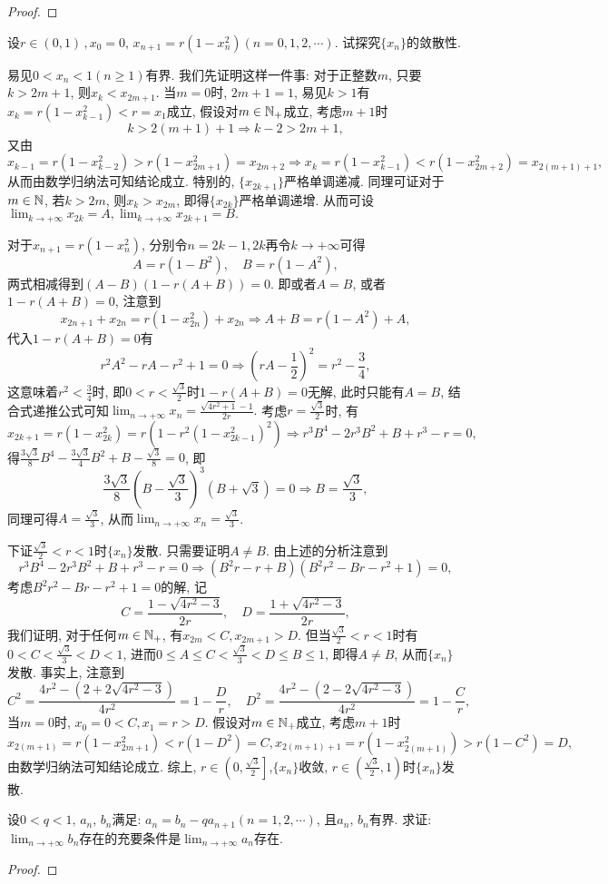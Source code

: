 \begin{quiza}
\begin{proof}
\end{proof}
\woe 设\(r\in (0,1)\,,x_0=0,\,x_{n+1}=r(1-x_n^2)(n=0,1,2,\cdots)\). 试探究\(\{x_n\}\)的敛散性.
\begin{solution}
易见\(0<x_n<1(n\geqslant 1)\)有界. 我们先证明这样一件事: 对于正整数\(m\), 只要\(k>2m+1\), 则\(x_k<x_{2m+1}\). 当\(m=0\)时, \(2m+1=1\), 易见\(k>1\)有\(x_k=r(1-x_{k-1}^2)<r=x_1\)成立, 假设对\(m\in\mathbb{N}_+\)成立, 考虑\(m+1\)时\[k>2(m+1)+1\Rightarrow k-2>2m+1,\]又由\[x_{k-1}=r(1-x_{k-2}^2)>r(1-x_{2m+1}^2)=x_{2m+2}\Rightarrow x_k=r(1-x_{k-1}^2)<r(1-x_{2m+2}^2)=x_{2(m+1)+1},\]从而由数学归纳法可知结论成立. 特别的, \(\{x_{2k+1}\}\)严格单调递减. 同理可证对于\(m\in\mathbb{N}\), 若\(k>2m\), 则\(x_k>x_{2m}\), 即得\(\{x_{2k}\}\)严格单调递增. 从而可设\(\lim_{k\rightarrow+\infty}x_{2k}=A,\lim_{k\rightarrow+\infty}x_{2k+1}=B.\)

对于\(x_{n+1}=r(1-x_n^2)\), 分别令\(n=2k-1,2k\)再令\(k\rightarrow+\infty\)可得\[A=r(1-B^2),\quad B=r(1-A^2),\]两式相减得到\(\left(A-B\right)\left(1-r(A+B)\right)=0\). 即或者\(A=B\), 或者\(1-r(A+B)=0\), 注意到
\[x_{2n+1}+x_{2n}=r(1-x_{2n}^2)+x_{2n}\Rightarrow A+B=r(1-A^2)+A,\]
代入\(1-r(A+B)=0\)有\[r^2A^2-rA-r^2+1=0\Rightarrow\left(rA-\frac{1}{2}\right)^2=r^2-\frac{3}{4},\]这意味着\(r^2<\frac{3}{4}\)时, 即\(0<r<\frac{\sqrt{3}}{2}\)时\(1-r(A+B)=0\)无解, 此时只能有\(A=B\), 结合式递推公式可知\(\lim_{n\rightarrow+\infty}x_n=\frac{\sqrt{4r^2+1}-1}{2r}.\)
考虑\(r=\frac{\sqrt{3}}{2}\)时, 有\[x_{2k+1}=r(1-x_{2k}^2)=r\left(1-r^2(1-x_{2k-1}^2)^2\right)\Rightarrow r^3B^4-2r^3B^2+B+r^3-r=0,\]得\(\frac{3\sqrt{3}}{8}B^4-\frac{3\sqrt{3}}{4}B^2+B-\frac{\sqrt{3}}{8}=0\), 即\[\frac{3\sqrt{3}}{8}\left(B-\frac{\sqrt{3}}{3}\right)^3(B+\sqrt{3})=0\Rightarrow B=\frac{\sqrt{3}}{3},\]同理可得\(A=\frac{\sqrt{3}}{3}\), 从而\(\lim_{n\rightarrow+\infty}x_n=\frac{\sqrt{3}}{3}\).

下证\(\frac{\sqrt{3}}{2}<r<1\)时\(\{x_n\}\)发散. 只需要证明\(A\ne B\). 由上述的分析注意到\[r^3B^4-2r^3B^2+B+r^3-r=0\Rightarrow (B^2r-r+B)(B^2r^2-Br-r^2+1)=0,\]
考虑\(B^2r^2-Br-r^2+1=0\)的解, 记\[C=\frac{1-\sqrt{4r^2-3}}{2r},\quad D=\frac{1+\sqrt{4r^2-3}}{2r},\]我们证明, 对于任何\(m\in\mathbb{N}_+\), 有\(x_{2m}<C,x_{2m+1}>D\). 但当\(\frac{\sqrt{3}}{2}<r<1\)时有\(0<C<\frac{\sqrt{3}}{3}<D<1\), 进而\(0\leqslant A\leqslant C<\frac{\sqrt{3}}{3}<D\leqslant B\leqslant 1\), 即得\(A\ne B\), 从而\(\{x_n\}\)发散. 事实上, 注意到\[
C^2=\frac{4r^2-\left(2+2\sqrt{4r^2-3}\right)}{4r^2}=1-\frac{D}{r},\quad D^2=\frac{4r^2-\left(2-2\sqrt{4r^2-3}\right)}{4r^2}=1-\frac{C}{r},
\]当\(m=0\)时, \(x_0=0<C,x_1=r>D.\) 假设对\(m\in\mathbb{N}_+\)成立, 考虑\(m+1\)时\[x_{2(m+1)}=r\left(1-x_{2m+1}^2\right)<r(1-D^2)=C,x_{2(m+1)+1}=r\left(1-x_{2(m+1)}^2\right)>r\left(1-C^2\right)=D,\]由数学归纳法可知结论成立. 综上, \(r\in\left(0,\frac{\sqrt{3}}{2}\right]\),\(\{x_n\}\)收敛, \(r\in\left(\frac{\sqrt{3}}{2},1\right)\)时\(\{x_n\}\)发散.
\end{solution}
\woe 设\(0<q<1,\,a_n,\,b_n\)满足: \(a_n=b_n-qa_{n+1}(n=1,2,\cdots)\), 且\(a_n,\,b_n\)有界. 求证: \(\lim_{n\rightarrow+\infty}b_n\)存在的充要条件是\(\lim_{n\rightarrow+\infty}a_n\)存在.
\begin{proof}


\end{proof}
\end{quiza}
